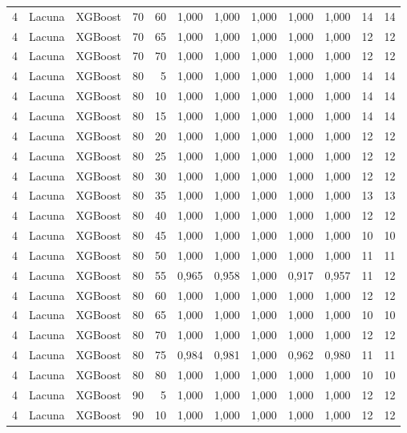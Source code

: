 \begin{longtable}{@{}rllrrrrrrrrr@{}}
4 & Lacuna & XGBoost & 70 & 60 & 1,000 & 1,000 & 1,000 & 1,000 & 1,000 & 14 & 14 \\
4 & Lacuna & XGBoost & 70 & 65 & 1,000 & 1,000 & 1,000 & 1,000 & 1,000 & 12 & 12 \\
4 & Lacuna & XGBoost & 70 & 70 & 1,000 & 1,000 & 1,000 & 1,000 & 1,000 & 12 & 12 \\
4 & Lacuna & XGBoost & 80 & 5 & 1,000 & 1,000 & 1,000 & 1,000 & 1,000 & 14 & 14 \\
4 & Lacuna & XGBoost & 80 & 10 & 1,000 & 1,000 & 1,000 & 1,000 & 1,000 & 14 & 14 \\
4 & Lacuna & XGBoost & 80 & 15 & 1,000 & 1,000 & 1,000 & 1,000 & 1,000 & 14 & 14 \\
4 & Lacuna & XGBoost & 80 & 20 & 1,000 & 1,000 & 1,000 & 1,000 & 1,000 & 12 & 12 \\
4 & Lacuna & XGBoost & 80 & 25 & 1,000 & 1,000 & 1,000 & 1,000 & 1,000 & 12 & 12 \\
4 & Lacuna & XGBoost & 80 & 30 & 1,000 & 1,000 & 1,000 & 1,000 & 1,000 & 12 & 12 \\
4 & Lacuna & XGBoost & 80 & 35 & 1,000 & 1,000 & 1,000 & 1,000 & 1,000 & 13 & 13 \\
4 & Lacuna & XGBoost & 80 & 40 & 1,000 & 1,000 & 1,000 & 1,000 & 1,000 & 12 & 12 \\
4 & Lacuna & XGBoost & 80 & 45 & 1,000 & 1,000 & 1,000 & 1,000 & 1,000 & 10 & 10 \\
4 & Lacuna & XGBoost & 80 & 50 & 1,000 & 1,000 & 1,000 & 1,000 & 1,000 & 11 & 11 \\
4 & Lacuna & XGBoost & 80 & 55 & 0,965 & 0,958 & 1,000 & 0,917 & 0,957 & 11 & 12 \\
4 & Lacuna & XGBoost & 80 & 60 & 1,000 & 1,000 & 1,000 & 1,000 & 1,000 & 12 & 12 \\
4 & Lacuna & XGBoost & 80 & 65 & 1,000 & 1,000 & 1,000 & 1,000 & 1,000 & 10 & 10 \\
4 & Lacuna & XGBoost & 80 & 70 & 1,000 & 1,000 & 1,000 & 1,000 & 1,000 & 12 & 12 \\
4 & Lacuna & XGBoost & 80 & 75 & 0,984 & 0,981 & 1,000 & 0,962 & 0,980 & 11 & 11 \\
4 & Lacuna & XGBoost & 80 & 80 & 1,000 & 1,000 & 1,000 & 1,000 & 1,000 & 10 & 10 \\
4 & Lacuna & XGBoost & 90 & 5 & 1,000 & 1,000 & 1,000 & 1,000 & 1,000 & 12 & 12 \\
4 & Lacuna & XGBoost & 90 & 10 & 1,000 & 1,000 & 1,000 & 1,000 & 1,000 & 12 & 12 \\

\end{longtable}

